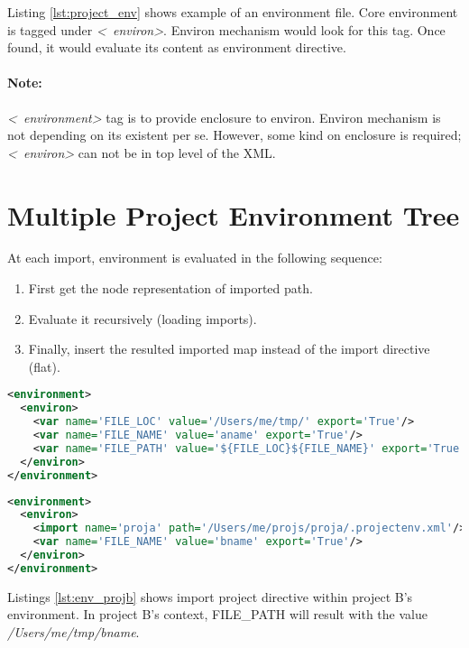 \documentclass[design.tex]{subfiles}
\begin{document}
Listing \ref{lst:project_env} shows example of an environment file.  Core environment is tagged under \emph{\textless~environ\textgreater}.  Environ mechanism would look for this tag.  Once found, it would evaluate its content as environment directive.

\paragraph{Note:} \emph{\textless~environment\textgreater} tag is to provide enclosure to environ.  Environ mechanism is not depending on its existent per se.  However, some kind on enclosure is required;  \emph{\textless~environ\textgreater} can not be in top level of the XML.

\section{Multiple Project Environment Tree}
At each import, environment is evaluated in the following sequence:
\begin{enumerate}
	\item First get the node representation of imported path.
	\item Evaluate it recursively (loading imports).
	\item Finally, insert the resulted imported map instead of the import directive (flat).
\end{enumerate} 

%

\begin{lstlisting}[language=XML, label=lst:env_proja, caption='Project A: /Users/me/projs/proja/.projectenv.xml]
<environment>
  <environ>
    <var name='FILE_LOC' value='/Users/me/tmp/' export='True'/>
    <var name='FILE_NAME' value='aname' export='True'/>
    <var name='FILE_PATH' value='${FILE_LOC}${FILE_NAME}' export='True'/>
  </environ>
</environment>
\end{lstlisting}

\begin{lstlisting}[language=XML, label=lst:env_projb, caption='Project B: /Users/me/projs/projb/.projectenv.xml']
<environment>
  <environ>
    <import name='proja' path='/Users/me/projs/proja/.projectenv.xml'/>
    <var name='FILE_NAME' value='bname' export='True'/>
  </environ>
</environment>
\end{lstlisting}

Listings \ref{lst:env_projb} shows import project directive within project B's environment.  In project B's context, FILE\_PATH will result with the value \emph{/Users/me/tmp/bname}.
\end{document}
